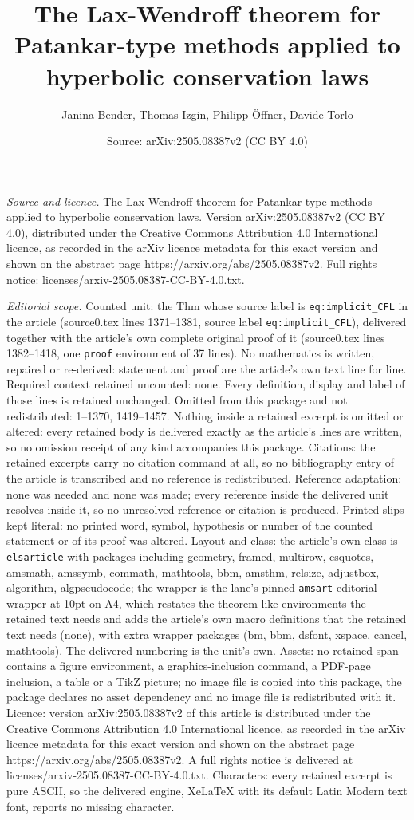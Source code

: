 \documentclass[10pt,a4paper]{amsart}
\title[The Lax-Wendroff theorem for Patankar-type methods applied t]{The Lax-Wendroff theorem for Patankar-type methods applied to hyperbolic conservation laws}
\author{Janina Bender, Thomas Izgin, Philipp \"Offner, Davide Torlo}
\date{Source: arXiv:2505.08387v2 (CC BY 4.0)}
\begin{document}
\maketitle

\noindent\emph{Source and licence.} The Lax-Wendroff theorem for Patankar-type methods applied to hyperbolic conservation laws. Version arXiv:2505.08387v2 (CC BY 4.0), distributed under the Creative Commons Attribution 4.0 International licence, as recorded in the arXiv licence metadata for this exact version and shown on the abstract page https://arxiv.org/abs/2505.08387v2. Full rights notice: licenses/arxiv-2505.08387-CC-BY-4.0.txt.\par\smallskip

\noindent\textit{Editorial scope.} Counted unit: the Thm whose source label is \texttt{eq:implicit\_CFL} in the article (source0.tex lines 1371--1381, source label \texttt{eq:implicit\_CFL}), delivered together with the article's own complete original proof of it (source0.tex lines 1382--1418, one \texttt{proof} environment of 37 lines). No mathematics is written, repaired or re-derived: statement and proof are the article's own text line for line. Required context retained uncounted: none. Every definition, display and label of those lines is retained unchanged. Omitted from this package and not redistributed: 1--1370, 1419--1457. Nothing inside a retained excerpt is omitted or altered: every retained body is delivered exactly as the article's lines are written, so no omission receipt of any kind accompanies this package. Citations: the retained excerpts carry no citation command at all, so no bibliography entry of the article is transcribed and no reference is redistributed. Reference adaptation: none was needed and none was made; every reference inside the delivered unit resolves inside it, so no unresolved reference or citation is produced. Printed slips kept literal: no printed word, symbol, hypothesis or number of the counted statement or of its proof was altered. Layout and class: the article's own class is \texttt{elsarticle} with packages including geometry, framed, multirow, csquotes, amsmath, amssymb, commath, mathtools, bbm, amsthm, relsize, adjustbox, algorithm, algpseudocode; the wrapper is the lane's pinned \texttt{amsart} editorial wrapper at 10pt on A4, which restates the theorem-like environments the retained text needs and adds the article's own macro definitions that the retained text needs (none), with extra wrapper packages (bm, bbm, dsfont, xspace, cancel, mathtools). The delivered numbering is the unit's own. Assets: no retained span contains a figure environment, a graphics-inclusion command, a PDF-page inclusion, a table or a TikZ picture; no image file is copied into this package, the package declares no asset dependency and no image file is redistributed with it. Licence: version arXiv:2505.08387v2 of this article is distributed under the Creative Commons Attribution 4.0 International licence, as recorded in the arXiv licence metadata for this exact version and shown on the abstract page https://arxiv.org/abs/2505.08387v2. A full rights notice is delivered at licenses/arxiv-2505.08387-CC-BY-4.0.txt. Characters: every retained excerpt is pure ASCII, so the delivered engine, XeLaTeX with its default Latin Modern text font, reports no missing character.
\end{document}
